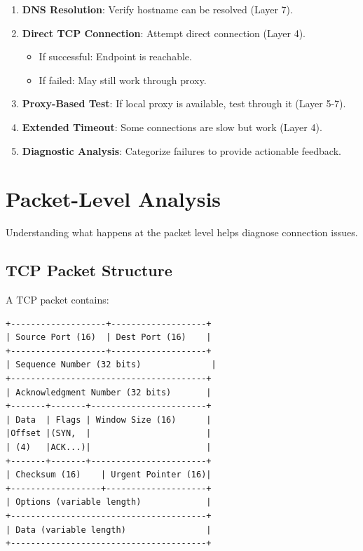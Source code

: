 \begin{enumerate}
    \item \textbf{DNS Resolution}: Verify hostname can be resolved (Layer 7).
    \item \textbf{Direct TCP Connection}: Attempt direct connection (Layer 4).
    \begin{itemize}
        \item If successful: Endpoint is reachable.
        \item If failed: May still work through proxy.
    \end{itemize}
    \item \textbf{Proxy-Based Test}: If local proxy is available, test through it (Layer 5-7).
    \item \textbf{Extended Timeout}: Some connections are slow but work (Layer 4).
    \item \textbf{Diagnostic Analysis}: Categorize failures to provide actionable feedback.
\end{enumerate}

\section{Packet-Level Analysis}

Understanding what happens at the packet level helps diagnose connection issues.

\subsection{TCP Packet Structure}

A TCP packet contains:

\begin{verbatim}
+-------------------+-------------------+
| Source Port (16)  | Dest Port (16)    |
+-------------------+-------------------+
| Sequence Number (32 bits)              |
+---------------------------------------+
| Acknowledgment Number (32 bits)       |
+-------+-------+-----------------------+
| Data  | Flags | Window Size (16)      |
|Offset |(SYN,  |                       |
| (4)   |ACK...)|                       |
+-------+-------+-----------------------+
| Checksum (16)    | Urgent Pointer (16)|
+------------------+--------------------+
| Options (variable length)             |
+---------------------------------------+
| Data (variable length)                |
+---------------------------------------+
\end{verbatim}

